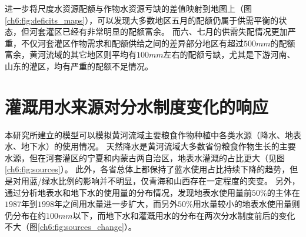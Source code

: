 进一步将尺度水资源配额与作物水资源亏缺的差值映射到地图上（图\ref{ch6:fig:deficits_maps}），可以发现大多数地区五月的配额仍属于供需平衡的状态，但河套灌区已经有非常明显的配额富余。
而六、七月的供需失配情况更加严重，不仅河套灌区作物需求和配额供给之间的差异部分地区有超过$500 mm$的配额富余，黄河流域的其它地区则平均有$100 mm$左右的配额亏缺，尤其是下游河南、山东的灌区，均有严重的配额不足情况。





\section{灌溉用水来源对分水制度变化的响应}

本研究所建立的模型可以模拟黄河流域主要粮食作物种植中各类水源（降水、地表水、地下水）的使用情况。
天然降水是黄河流域大多数省份粮食作物生长的主要水源，但在河套灌区的宁夏和内蒙古两自治区，地表水灌溉的占比更大（见图\ref{ch6:fig:sources}）。
此外，各省总体上都保持了蓝水使用占比持续下降的趋势，但是对用蓝/绿水比例的影响并不明显，仅青海和山西存在一定程度的突变。
另外，通过分析地表水和地下水的使用量的分布情况，发现地表水使用量前$50\%$的主体在$1987$年到$1998$年之间用水量进一步扩大，而另外$50\%$用水量较小的地表水使用量则仍分布在约$100mm$以下，而地下水和灌溉用水的分布在两次分水制度前后的变化不大（图\ref{ch6:fig:sources_change}）。


